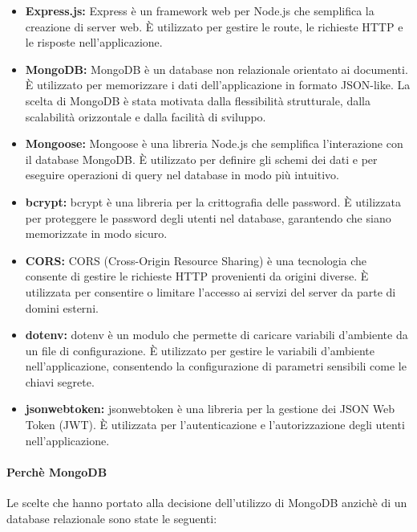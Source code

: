 \begin{itemize}
      \item \textbf{Express.js:} Express è un framework web per Node.js che semplifica la creazione di server web. È utilizzato per gestire le route, le richieste HTTP e le risposte nell'applicazione.

      \item \textbf{MongoDB:} MongoDB è un database non relazionale orientato ai documenti. È utilizzato per memorizzare i dati dell'applicazione in formato JSON-like. La scelta di MongoDB è stata motivata dalla flessibilità strutturale, dalla scalabilità orizzontale e dalla facilità di sviluppo.

      \item \textbf{Mongoose:} Mongoose è una libreria Node.js che semplifica l'interazione con il database MongoDB. È utilizzato per definire gli schemi dei dati e per eseguire operazioni di query nel database in modo più intuitivo.

      \item \textbf{bcrypt:} bcrypt è una libreria per la crittografia delle password. È utilizzata per proteggere le password degli utenti nel database, garantendo che siano memorizzate in modo sicuro.

      \item \textbf{CORS:} CORS (Cross-Origin Resource Sharing) è una tecnologia che consente di gestire le richieste HTTP provenienti da origini diverse. È utilizzata per consentire o limitare l'accesso ai servizi del server da parte di domini esterni.

      \item \textbf{dotenv:} dotenv è un modulo che permette di caricare variabili d'ambiente da un file di configurazione. È utilizzato per gestire le variabili d'ambiente nell'applicazione, consentendo la configurazione di parametri sensibili come le chiavi segrete.

      \item \textbf{jsonwebtoken:} jsonwebtoken è una libreria per la gestione dei JSON Web Token (JWT). È utilizzata per l'autenticazione e l'autorizzazione degli utenti nell'applicazione.
\end{itemize}

\paragraph{Perchè MongoDB}

Le scelte che hanno portato alla decisione dell'utilizzo di MongoDB anzichè
di un database relazionale sono state le seguenti:

